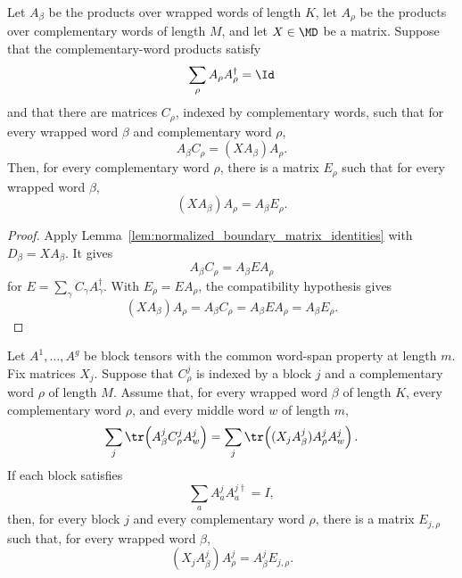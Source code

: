 \begin{lemma}
    \label{lem:complementary_word_boundary_identities_from_pgvwc}
    \leanok
    Let $A_\beta$ be the products over wrapped words of length $K$, let
    $A_\rho$ be the products over complementary words of length $M$, and let
    $X\in \MD$ be a matrix.  Suppose that the complementary-word
    products satisfy
    \[
        \sum_\rho A_\rho A_\rho^\dagger=\Id
    \]
    and that there are matrices $C_\rho$, indexed by complementary words, such
    that for every wrapped word $\beta$ and complementary word $\rho$,
    \[
        A_\beta C_\rho=(X A_\beta)A_\rho.
    \]
    Then, for every complementary word $\rho$, there is a matrix $E_\rho$ such
    that for every wrapped word $\beta$,
    \[
        (X A_\beta)A_\rho=A_\beta E_\rho.
    \]
\end{lemma}

\begin{proof}
    \leanok
    Apply Lemma~\ref{lem:normalized_boundary_matrix_identities} with
    $D_\beta=X A_\beta$. It gives
    \[
        A_\beta C_\rho=A_\beta E A_\rho
    \]
    for $E=\sum_\gamma C_\gamma A_\gamma^\dagger$. With $E_\rho=EA_\rho$,
    the compatibility hypothesis gives
    \[
        (X A_\beta)A_\rho
        = A_\beta C_\rho
        = A_\beta E A_\rho
        = A_\beta E_\rho.
    \]
\end{proof}

\begin{lemma}
    \label{lem:complementary_word_boundary_identities_from_trace_decompositions}
    \leanok
    Let $A^1,\ldots,A^g$ be block tensors with the common word-span property
    at length $m$. Fix matrices $X_j$. Suppose that $C^j_\rho$ is indexed
    by a block $j$ and a complementary word $\rho$ of length $M$. Assume
    that, for every wrapped word $\beta$ of length $K$, every complementary
    word $\rho$, and every middle word $w$ of length $m$,
    \[
        \sum_j\tr\!\left(A^j_\beta C^j_\rho A^j_w\right)
        =
        \sum_j\tr\!\left((X_jA^j_\beta)A^j_\rho A^j_w\right).
    \]
    If each block satisfies
    \[
        \sum_a A^j_aA^{j\dagger}_a=I,
    \]
    then, for every block $j$ and every complementary word $\rho$, there is
    a matrix $E_{j,\rho}$ such that, for every wrapped word $\beta$,
    \[
        (X_jA^j_\beta)A^j_\rho=A^j_\beta E_{j,\rho}.
    \]
\end{lemma}

